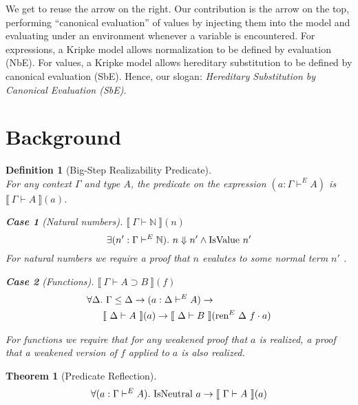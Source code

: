 \documentclass[preprint,nonatbib]{sigplanconf}
\newtheorem{mydfn}{Definition}
\newtheorem{mysubdfn}{Case}
\numberwithin{mysubdfn}{mydfn}
\newtheorem{mythm}{Theorem}
\def\bigstep{\Downarrow}
\def\arr{\supset}
\def\marr{\rightarrow}
\def\app{\cdot}
\def\nat{\mathbb{N}}
\newcommand{\el}[1]{\llbracket ~ #1 ~ \rrbracket}
\newcommand{\fun}[1]{\textmd{#1}}
\newcommand{\typm}[1]{\el{\Gamma \vdash #1}}
\newcommand{\dtypm}[1]{\el{\Delta \vdash #1}}
\newcommand{\type}[1]{\Gamma \vdash^E #1}
\newcommand{\dtype}[1]{\Delta \vdash^E #1}
\newcommand{\ren}[1]{\Gamma \le #1}
\def\dren{\ren{\Delta}}
\begin{document}
We get to reuse the arrow on the right. Our contribution is the arrow
on the top, performing ``canonical evaluation'' of values by injecting
them into the model and evaluating under an environment whenever a
variable is encountered. For expressions, a Kripke model allows
normalization to be defined by evaluation (NbE). For values, a Kripke
model allows hereditary substitution to be defined by canonical
evaluation (SbE). Hence, our slogan:
{\it Hereditary Substitution by Canonical Evaluation (SbE)}.


\section{Background}
\label{sec:background}


\begin{mydfn}[Big-Step Realizability Predicate]
$ $\\
For any context $\Gamma$ and type $A$, the predicate on the expression
$(a : \type{A})$ is $\typm{A}(a)$.

\begin{mysubdfn}[Natural numbers]
$\typm{\nat}(n)$
$$
\exists (n' : \type{\nat}).~ n \bigstep n' \wedge \fun{IsValue} ~ n'
$$
For natural numbers we require a proof that $n$ evalutes to
some normal term $n'$ .
\end{mysubdfn}


\begin{mysubdfn}[Functions]
$\typm{A \arr B}(f)$
\begin{align*}
\forall \Delta.&~ \dren \marr (a : \dtype{A}) \marr \\
&\dtypm{A}(a) \marr \dtypm{B}(\fun{ren}^E ~ \Delta ~ f \app a)
\end{align*}



For functions we require that for any weakened proof that $a$
is realized, a proof that a weakened version of $f$ applied to
$a$ is also realized.
\end{mysubdfn}

\end{mydfn}

\begin{mythm}[Predicate Reflection]
$$\forall (a : \type{A}).~ \fun{IsNeutral} ~ a \marr \typm{A}(a)$$
\end{mythm}
\end{document}
